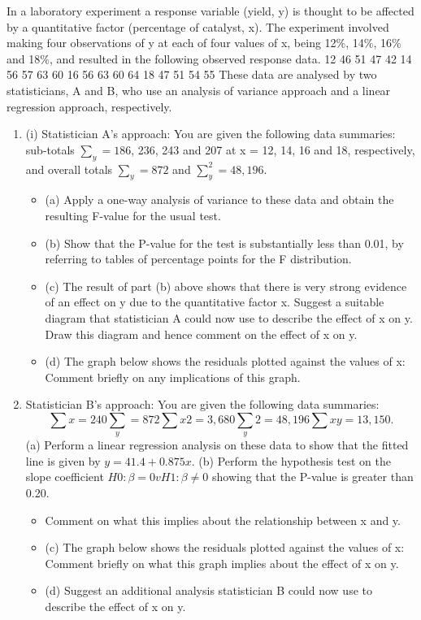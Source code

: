 \documentclass[a4paper,12pt]{article}
\begin{document}

In a laboratory experiment a response variable (yield, y) is thought to be affected by a quantitative factor (percentage of catalyst, x). The experiment involved making four
observations of y at each of four values of x, being 12\%, 14\%, 16\% and 18\%, and
resulted in the following observed response data.
12%
46
51
47
42
14%
56
57
63
60
16%
56
63
60
64
18%
47
51
54
55
These data are analysed by two statisticians, A and B, who use an analysis of variance
approach and a linear regression approach, respectively.
\begin{enumerate}
\item (i)
Statistician A’s approach:
You are given the following data summaries:
sub-totals $\sum_y = 186$, 236, 243 and 207 at x = 12, 14, 16 and 18,
respectively, and overall totals $\sum_y = 872$ and $\sum_y^2 = 48,196$.
\begin{itemize}
\item (a) Apply a one-way analysis of variance to these data and obtain the
resulting F-value for the usual test.
\item (b) Show that the P-value for the test is substantially less than 0.01, by referring to tables of percentage points for the F distribution.
\item (c) The result of part (b) above shows that there is very strong evidence of
an effect on y due to the quantitative factor x. Suggest a suitable
diagram that statistician A could now use to describe the effect of x on
y. Draw this diagram and hence comment on the effect of x on y.
\item (d) The graph below shows the residuals plotted against the values of x:
Comment briefly on any implications of this graph.
\end{itemize}

\item Statistician B’s approach:
You are given the following data summaries:
\[\sum x = 240 \sum_y = 872 \sum x 2 = 3,680 \sum_y 2 = 48,196 \sum xy = 13,150.\]
(a) Perform a linear regression analysis on these data to show that the
fitted line is given by $y = 41.4 + 0.875x$.
(b) Perform the hypothesis test on the slope coefficient
$H 0 : \beta = 0 v H 1 : \beta \neq 0$
showing that the P-value is greater than 0.20.

\begin{itemize}
    \item Comment on what this implies about the relationship between x and y.

\item (c) The graph below shows the residuals plotted against the values of x:
Comment briefly on what this graph implies about the effect of x on y.
\item (d)
Suggest an additional analysis statistician B could now use to describe
the effect of x on y.
\end{itemize}
\end{enumerate}
\newpage
\end{document}
